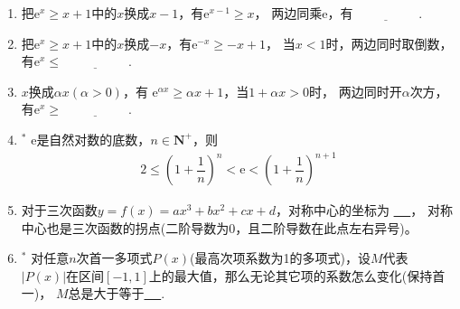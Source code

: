 \documentclass{article}
\newif\ifte
\newcommand{\e}{\mathrm{e}}
\renewcommand\leq\leqslant
\renewcommand\geq\geqslant
\begin{document}
\begin{multicols}{2}
\begin{enumerate}[leftmargin=20pt]
\item 把$ \e^x\geq x+1 $中的$ x $换成$ x-1 $，有$ \e^{x-1}\geq x $，
两边同乘$ \e $，有$ \underline{\ \ifte \e^x\geq \e x
    \else \hspace{2cm} \fi\ } $.

\item 把$ \e^x\geq x+1 $中的$ x $换成$ -x $，有$ \e^{-x}\geq -x+1 $，
当$ x<1 $时，两边同时取倒数，有$ \e^x\leq \underline{\ \ifte 
\dfrac{1}{1-x}  \else \hspace{2cm} \fi\ } $.

\item $ x $换成$ \alpha x (\alpha>0)$，有
$ \e^{\alpha x}\geq \alpha x+1 $，当$ 1+\alpha x>0 $时，
两边同时开$ \alpha $次方，有$ \e^x\geq \underline{\ \ifte
(1+\alpha x)^{\frac{1}{\alpha}} \else \hspace{2cm} \fi\ } $. 

\item $^*$ $ \e $是自然对数的底数，$ n\in \textbf{N}^+ $，则
\begin{gather*}
    2 \leq \left( 1+\dfrac{1}{n}\right)^{n} < \e < 
    \left( 1+\dfrac{1}{n}\right)^{n+1}
\end{gather*}

\item 对于三次函数$ y=f(x)=ax^3+bx^2+cx+d $，对称中心的坐标为
\underline{\ \ifte $ \left(-\dfrac{b}{3a},f\Big(-\dfrac{b}{3a}
    \Big)\right) $\else \hspace{2.5cm} \fi\ }，
对称中心也是三次函数的拐点(二阶导数为0，且二阶导数在此点左右异号)。

\item $^*$ 对任意$ n $次首一多项式$ P(x) $(最高次项系数为1的多项式)，设$ M $代表
$ |P(x)| $在区间$ [-1,1] $上的最大值，那么无论其它项的系数怎么变化(保持首一)，
$ M $总是大于等于\underline{\ \ifte $ \dfrac{1}{2^{n-1}} $
    \else \hspace{2cm} \fi\ }. 


\end{enumerate}
\end{multicols}
\end{document}
